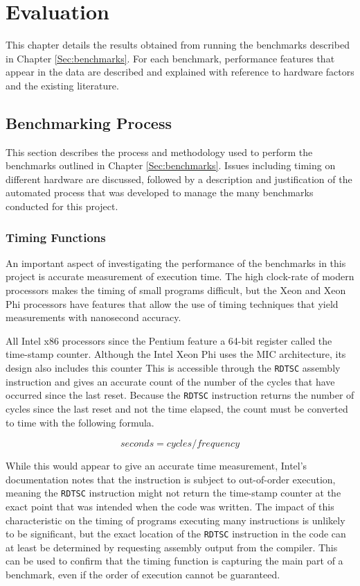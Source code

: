 \documentclass{report}
\begin{document}
\chapter{Evaluation} \label{Sec:evaluation}

This chapter details the results obtained from running the benchmarks described in Chapter \ref{Sec:benchmarks}. For each benchmark, performance features that appear in the data are described and explained with reference to hardware factors and the existing literature.

\section{Benchmarking Process} \label{Sec:benchmarkingprocess}

This section describes the process and methodology used to perform the benchmarks outlined in Chapter \ref{Sec:benchmarks}. Issues including timing on different hardware are discussed, followed by a description and justification of the automated process that was developed to manage the many benchmarks conducted for this project.

\subsection{Timing Functions} \label{Sec:timingfunctions}
An important aspect of investigating the performance of the benchmarks in this project is accurate measurement of execution time. The high clock-rate of modern processors makes the timing of small programs difficult, but the Xeon and Xeon Phi processors have features that allow the use of timing techniques that yield measurements with nanosecond accuracy.

All Intel x86 processors since the Pentium feature a 64-bit register called the time-stamp counter. Although the Intel Xeon Phi uses the MIC architecture, its design also includes this counter This is accessible through the \verb!RDTSC! assembly instruction and gives an accurate count of the number of the cycles that have occurred since the last reset\cite{Rdtsc}. Because the \verb!RDTSC! instruction returns the number of cycles since the last reset and not the time elapsed, the count must be converted to time with the following formula\cite{Rdtsc}.

\begin{equation}
seconds = cycles / frequency
\end{equation}

While this would appear to give an accurate time measurement, Intel's documentation notes that the instruction is subject to out-of-order execution, meaning the \verb!RDTSC! instruction might not return the time-stamp counter at the exact point that was intended when the code was written\cite{Rdtsc}. The impact of this characteristic on the timing of programs executing many instructions is unlikely to be significant, but the exact location of the \verb!RDTSC! instruction in the code can at least be determined by requesting assembly output from the compiler. This can be used to confirm that the timing function is capturing the main part of a benchmark, even if the order of execution cannot be guaranteed.
\end{document}
